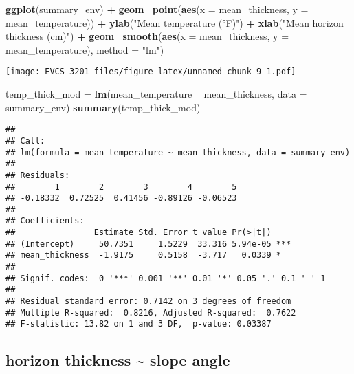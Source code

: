 \documentclass[]{book}
\newenvironment{Shaded}{\begin{snugshade}}{\end{snugshade}}
\newcommand{\KeywordTok}[1]{\textcolor[rgb]{0.13,0.29,0.53}{\textbf{#1}}}
\newcommand{\DataTypeTok}[1]{\textcolor[rgb]{0.13,0.29,0.53}{#1}}
\newcommand{\StringTok}[1]{\textcolor[rgb]{0.31,0.60,0.02}{#1}}
\newcommand{\OperatorTok}[1]{\textcolor[rgb]{0.81,0.36,0.00}{\textbf{#1}}}
\newcommand{\NormalTok}[1]{#1}
\begin{document}
\begin{Shaded}
\begin{Highlighting}[]
\KeywordTok{ggplot}\NormalTok{(summary_env) }\OperatorTok{+}
\StringTok{  }\KeywordTok{geom_point}\NormalTok{(}\KeywordTok{aes}\NormalTok{(}\DataTypeTok{x =}\NormalTok{ mean_thickness, }\DataTypeTok{y =}\NormalTok{ mean_temperature)) }\OperatorTok{+}
\StringTok{  }\KeywordTok{ylab}\NormalTok{(}\StringTok{"Mean temperature (°F)"}\NormalTok{) }\OperatorTok{+}
\StringTok{  }\KeywordTok{xlab}\NormalTok{(}\StringTok{"Mean horizon thickness (cm)"}\NormalTok{) }\OperatorTok{+}
\StringTok{  }\KeywordTok{geom_smooth}\NormalTok{(}\KeywordTok{aes}\NormalTok{(}\DataTypeTok{x =}\NormalTok{ mean_thickness, }\DataTypeTok{y =}\NormalTok{ mean_temperature), }\DataTypeTok{method =} \StringTok{"lm"}\NormalTok{)}
\end{Highlighting}
\end{Shaded}

\texttt{[image: EVCS-3201\_files/figure-latex/unnamed-chunk-9-1.pdf]}

\begin{Shaded}
\begin{Highlighting}[]
\NormalTok{temp_thick_mod =}\StringTok{ }\KeywordTok{lm}\NormalTok{(mean_temperature }\OperatorTok{~}\StringTok{ }\NormalTok{mean_thickness, }\DataTypeTok{data =}\NormalTok{ summary_env)}
\KeywordTok{summary}\NormalTok{(temp_thick_mod)}
\end{Highlighting}
\end{Shaded}

\begin{verbatim}
## 
## Call:
## lm(formula = mean_temperature ~ mean_thickness, data = summary_env)
## 
## Residuals:
##        1        2        3        4        5 
## -0.18332  0.72525  0.41456 -0.89126 -0.06523 
## 
## Coefficients:
##                Estimate Std. Error t value Pr(>|t|)    
## (Intercept)     50.7351     1.5229  33.316 5.94e-05 ***
## mean_thickness  -1.9175     0.5158  -3.717   0.0339 *  
## ---
## Signif. codes:  0 '***' 0.001 '**' 0.01 '*' 0.05 '.' 0.1 ' ' 1
## 
## Residual standard error: 0.7142 on 3 degrees of freedom
## Multiple R-squared:  0.8216, Adjusted R-squared:  0.7622 
## F-statistic: 13.82 on 1 and 3 DF,  p-value: 0.03387
\end{verbatim}

\subsection*{horizon thickness \textasciitilde{} slope
angle}\label{horizon-thickness-slope-angle}
\end{document}
